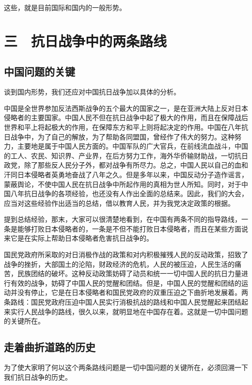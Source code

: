 这些，就是目前国际和国内的一般形势。

\section{三　抗日战争中的两条路线}

\subsection{中国问题的关键}

谈到国内形势，我们还应对中国抗日战争加以具体的分析。

中国是全世界参加反法西斯战争的五个最大的国家之一，是在亚洲大陆上反对日本侵略者的主要国家。中国人民不但在抗日战争中起了极大的作用，而且在保障战后世界和平上将起极大的作用，在保障东方和平上则将起决定的作用。中国在八年抗日战争中，为了自己的解放，为了帮助各同盟国，曾经作了伟大的努力。这种努力，主要地是属于中国人民方面的。中国军队的广大官兵，在前线流血战斗，中国的工人、农民、知识界、产业界，在后方努力工作，海外华侨输财助战，一切抗日政党，除了那些反人民分子外，都对战争有所尽力。总之，中国人民以自己的血和汗同日本侵略者英勇地奋战了八年之久。但是多年以来，中国反动分子造作谣言，蒙蔽舆论，不使中国人民在抗日战争中所起作用的真相为世人所知。同时，对于中国八年抗日战争的各项经验，也还没有人作出全面的总结来。因此，我们的大会，应当对这些经验作出适当的总结，借以教育人民，并为我党决定政策的根据。

提到总结经验，那末，大家可以很清楚地看到，在中国有两条不同的指导路线，一条是能够打败日本侵略者的，一条是不但不能打败日本侵略者，而且在某些方面说来它是在实际上帮助日本侵略者危害抗日战争的。

国民党政府所采取的对日消极作战的政策和对内积极摧残人民的反动政策，招致了战争的挫折，大部国土的沦陷，财政经济的危机，人民的被压迫，人民生活的痛苦，民族团结的破坏。这种反动政策妨碍了动员和统一一切中国人民的抗日力量进行有效的战争，妨碍了中国人民的觉醒和团结。但是，中国人民的觉醒和团结的运动并没有停止，它是在日本侵略者和国民党政府的双重压迫之下曲折地发展着。两条路线：国民党政府压迫中国人民实行消极抗战的路线和中国人民觉醒起来团结起来实行人民战争的路线，很久以来，就明显地在中国存在着。这就是一切中国问题的关键所在。

\subsection{走着曲折道路的历史}

为了使大家明了何以这个两条路线问题是一切中国问题的关键所在，必须回溯一下我们抗日战争的历史。

